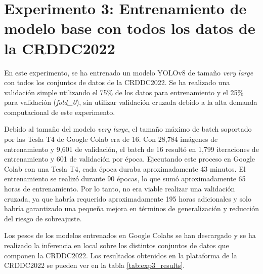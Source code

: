 \section{Experimento 3: Entrenamiento de modelo base con todos los datos de la CRDDC2022}\label{SEC:EXP3}
En este experimento, se ha entrenado un modelo YOLOv8 de tamaño \textit{very large} con todos los conjuntos de datos de la CRDDC2022. Se ha realizado una validación simple utilizando el 75\% de los datos para entrenamiento y el 25\% para validación (\textit{fold\_0}), sin utilizar validación cruzada debido a la alta demanda computacional de este experimento.

Debido al tamaño del modelo \textit{very large}, el tamaño máximo de batch soportado por las Tesla T4 de Google Colab era de 16. Con 28,784 imágenes de entrenamiento y 9,601 de validación, el batch de 16 resultó en 1,799 iteraciones de entrenamiento y 601 de validación por época. Ejecutando este proceso en Google Colab con una Tesla T4, cada época duraba aproximadamente 43 minutos. El entrenamiento se realizó durante 90 épocas, lo que sumó aproximadamente 65 horas de entrenamiento. Por lo tanto, no era viable realizar una validación cruzada, ya que habría requerido aproximadamente 195 horas adicionales y solo habría garantizado una pequeña mejora en términos de generalización y reducción del riesgo de sobreajuste.

Los pesos de los modelos entrenados en Google Colabs se han descargado y se ha realizado la inferencia en local sobre los distintos conjuntos de datos que componen la CRDDC2022. Los resultados obtenidos en la plataforma de la CRDDC2022 se pueden ver en la tabla \ref{tab:exp3_results}.
\begin{table}[H]
    \centering
    \caption{F1-scores obtenidos en la plataforma de la CRDDC2022 para los distintos conjuntos de datos.}
    \label{tab:exp3_results}
\end{table}

